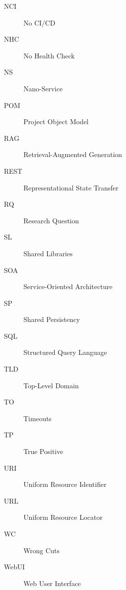 \begin{description}
    \item[NCI] No CI/CD
    \item[NHC] No Health Check
    \item[NS] Nano-Service
    \item[POM] Project Object Model
    \item[RAG] Retrieval-Augmented Generation
    \item[REST] Representational State Transfer
    \item[RQ] Research Question
    \item[SL] Shared Libraries
    \item[SOA] Service-Oriented Architecture
    \item[SP] Shared Persistency
    \item[SQL] Structured Query Language
    \item[TLD] Top-Level Domain
    \item[TO] Timeouts
    \item[TP] True Positive
    \item[URI] Uniform Resource Identifier
    \item[URL] Uniform Resource Locator
    \item[WC] Wrong Cuts
    \item[WebUI] Web User Interface
\end{description}